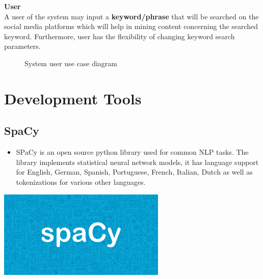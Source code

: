 \clearpage
\textbf{User}\\
A user of the system may input a \textbf{keyword/phrase} that will be searched on the social media platforms which will help in mining content concerning the searched keyword. Furthermore, user has the
flexibility of changing keyword search parameters.

\begin{figure}[h]
  \centering
  \caption[Example figure]%
  {System user use case diagram}
  \label{fig:ALAP:sm1}
\end{figure}



\section{Development Tools}

\subsection{SpaCy}

\begin{minipage}{0.4\textwidth}
\begin{itemize}
\item[\textbf{\emph{}}] 
SPaCy is an open source python library used for common NLP tasks. The library implements statistical neural network models, it has language support for English, German, Spanish, Portuguese, French, Italian, Dutch as well as tokenizations for various other languages.
\end{itemize}
\end{minipage}%
%
\begin{minipage}{0.4\textwidth}
\begin{center}
    \includegraphics[width=0.6\textwidth]{images/spacy_logo}
    \label{img:g}
\end{center}
\end{minipage}




